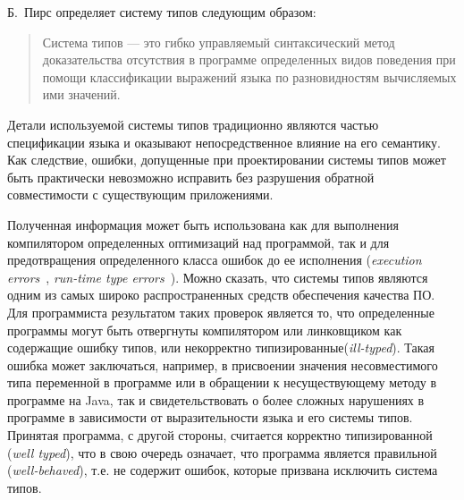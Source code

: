 Б.~Пирс определяет систему типов следующим образом:

\begin{quote}

  Система типов --- это гибко управляемый синтаксический метод доказательства
  отсутствия в программе определенных видов поведения при помощи классификации
  выражений языка по разновидностям вычисляемых ими значений.
\end{quote}


Детали используемой системы типов традиционно являются частью спецификации языка
и оказывают непосредственное влияние на его семантику. Как следствие, ошибки,
допущенные при проектировании системы типов может быть практически невозможно
исправить без разрушения обратной совместимости с существующим приложениями.


Полученная информация может быть использована как для выполнения компилятором
определенных оптимизаций над программой, так и для предотвращения определенного
класса ошибок до ее исполнения (\emph{execution errors}~\cite{Cardelli2004},
\emph{run-time type errors}~\cite{Pierce2002}). Можно сказать, что системы типов
являются одним из самых широко распространенных средств обеспечения качества ПО.
Для программиста результатом таких проверок является то, что определенные
программы могут быть отвергнуты компилятором или линковщиком как содержащие
ошибку типов, или некорректно типизированные(\emph{ill-typed}).
Такая ошибка может заключаться, например, в присвоении значения несовместимого
типа переменной в программе или в обращении к несуществующему методу в программе
на Java, так и свидетельствовать о более сложных нарушениях в программе в
зависимости от выразительности языка и его системы типов. Принятая 
программа, с другой стороны, считается корректно типизированной (\emph{well
  typed}), что в свою очередь означает, что программа является правильной
(\emph{well-behaved}), т.е. не содержит ошибок, которые призвана исключить
система типов. 

